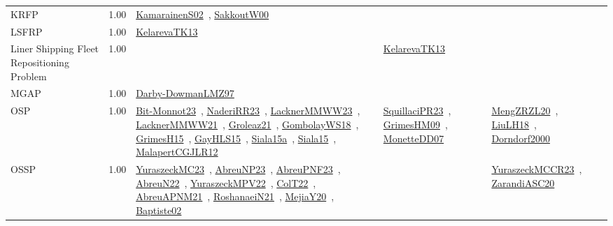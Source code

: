 {\begin{longtable}{p{3cm}r>{\raggedright\arraybackslash}p{6cm}>{\raggedright\arraybackslash}p{6cm}>{\raggedright\arraybackslash}p{8cm}}
\index{KRFP}\index{Classification!KRFP}KRFP &  1.00 & \href{../works/KamarainenS02.pdf}{KamarainenS02}~\cite{KamarainenS02}, \href{../works/SakkoutW00.pdf}{SakkoutW00}~\cite{SakkoutW00} &  & \\
\index{LSFRP}\index{Classification!LSFRP}LSFRP &  1.00 & \href{../works/KelarevaTK13.pdf}{KelarevaTK13}~\cite{KelarevaTK13} &  & \\
\index{Liner Shipping Fleet Repositioning Problem}\index{Classification!Liner Shipping Fleet Repositioning Problem}Liner Shipping Fleet Repositioning Problem &  1.00 &  & \href{../works/KelarevaTK13.pdf}{KelarevaTK13}~\cite{KelarevaTK13} & \\
\index{MGAP}\index{Classification!MGAP}MGAP &  1.00 & \href{../works/Darby-DowmanLMZ97.pdf}{Darby-DowmanLMZ97}~\cite{Darby-DowmanLMZ97} &  & \\
\index{OSP}\index{Classification!OSP}OSP &  1.00 & \href{../works/Bit-Monnot23.pdf}{Bit-Monnot23}~\cite{Bit-Monnot23}, \href{../works/NaderiRR23.pdf}{NaderiRR23}~\cite{NaderiRR23}, \href{../works/LacknerMMWW23.pdf}{LacknerMMWW23}~\cite{LacknerMMWW23}, \href{../works/LacknerMMWW21.pdf}{LacknerMMWW21}~\cite{LacknerMMWW21}, \href{../works/Groleaz21.pdf}{Groleaz21}~\cite{Groleaz21}, \href{../works/GombolayWS18.pdf}{GombolayWS18}~\cite{GombolayWS18}, \href{../works/GrimesH15.pdf}{GrimesH15}~\cite{GrimesH15}, \href{../works/GayHLS15.pdf}{GayHLS15}~\cite{GayHLS15}, \href{../works/Siala15a.pdf}{Siala15a}~\cite{Siala15a}, \href{../works/Siala15.pdf}{Siala15}~\cite{Siala15}, \href{../works/MalapertCGJLR12.pdf}{MalapertCGJLR12}~\cite{MalapertCGJLR12} & \href{../works/SquillaciPR23.pdf}{SquillaciPR23}~\cite{SquillaciPR23}, \href{../works/GrimesHM09.pdf}{GrimesHM09}~\cite{GrimesHM09}, \href{../works/MonetteDD07.pdf}{MonetteDD07}~\cite{MonetteDD07} & \href{../works/MengZRZL20.pdf}{MengZRZL20}~\cite{MengZRZL20}, \href{../works/LiuLH18.pdf}{LiuLH18}~\cite{LiuLH18}, \href{../works/Dorndorf2000.pdf}{Dorndorf2000}~\cite{Dorndorf2000}\\
\index{OSSP}\index{Classification!OSSP}OSSP &  1.00 & \href{../works/YuraszeckMC23.pdf}{YuraszeckMC23}~\cite{YuraszeckMC23}, \href{../works/AbreuNP23.pdf}{AbreuNP23}~\cite{AbreuNP23}, \href{../works/AbreuPNF23.pdf}{AbreuPNF23}~\cite{AbreuPNF23}, \href{../works/AbreuN22.pdf}{AbreuN22}~\cite{AbreuN22}, \href{../works/YuraszeckMPV22.pdf}{YuraszeckMPV22}~\cite{YuraszeckMPV22}, \href{../works/ColT22.pdf}{ColT22}~\cite{ColT22}, \href{../works/AbreuAPNM21.pdf}{AbreuAPNM21}~\cite{AbreuAPNM21}, \href{../works/RoshanaeiN21.pdf}{RoshanaeiN21}~\cite{RoshanaeiN21}, \href{../works/MejiaY20.pdf}{MejiaY20}~\cite{MejiaY20}, \href{../works/Baptiste02.pdf}{Baptiste02}~\cite{Baptiste02} &  & \href{../works/YuraszeckMCCR23.pdf}{YuraszeckMCCR23}~\cite{YuraszeckMCCR23}, \href{../works/ZarandiASC20.pdf}{ZarandiASC20}~\cite{ZarandiASC20}\\

\end{longtable}}
